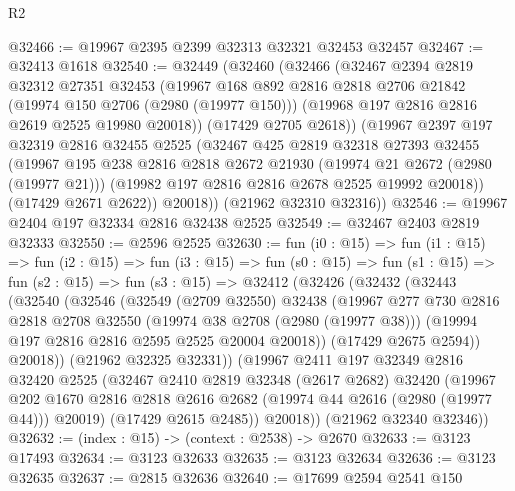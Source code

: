 \begin{lexlean}{R2}
\begin{coremodule}
@32466 := @19967 @2395 @2399 @32313 @32321 @32453 @32457
@32467 := @32413 @1618
@32540 := @32449
    (@32460
      (@32466
        (@32467
          @2394
          @2819
          @32312
          @27351
          @32453
          (@19967
            @168
            @892
            @2816
            @2818
            @2706
            @21842
            (@19974 @150 @2706 (@2980 (@19977 @150)))
            (@19968 @197 @2816 @2816 @2619 @2525 @19980 @20018))
          (@17429 @2705 @2618))
        (@19967
          @2397
          @197
          @32319
          @2816
          @32455
          @2525
          (@32467
            @425
            @2819
            @32318
            @27393
            @32455
            (@19967
              @195
              @238
              @2816
              @2818
              @2672
              @21930
              (@19974 @21 @2672 (@2980 (@19977 @21)))
              (@19982 @197 @2816 @2816 @2678 @2525 @19992 @20018))
            (@17429 @2671 @2622))
          @20018))
      (@21962 @32310 @32316))
@32546 := @19967 @2404 @197 @32334 @2816 @32438 @2525
@32549 := @32467 @2403 @2819 @32333
@32550 := @2596 @2525
@32630 := fun (i0 : @15) =>
  fun (i1 : @15) =>
  fun (i2 : @15) =>
  fun (i3 : @15) =>
  fun (s0 : @15) =>
  fun (s1 : @15) =>
  fun (s2 : @15) =>
  fun (s3 : @15) =>
  @32412
    (@32426
      (@32432
        (@32443
          (@32540
            (@32546
              (@32549
                (@2709 @32550)
                @32438
                (@19967
                  @277
                  @730
                  @2816
                  @2818
                  @2708
                  @32550
                  (@19974 @38 @2708 (@2980 (@19977 @38)))
                  (@19994 @197 @2816 @2816 @2595 @2525 @20004 @20018))
                (@17429 @2675 @2594))
              @20018))
          (@21962 @32325 @32331))
        (@19967
          @2411
          @197
          @32349
          @2816
          @32420
          @2525
          (@32467
            @2410
            @2819
            @32348
            (@2617 @2682)
            @32420
            (@19967
              @202
              @1670
              @2816
              @2818
              @2616
              @2682
              (@19974 @44 @2616 (@2980 (@19977 @44)))
              @20019)
            (@17429 @2615 @2485))
          @20018))
      (@21962 @32340 @32346))
@32632 := (index : @15) -> (context : @2538) -> @2670
@32633 := @3123 @17493
@32634 := @3123 @32633
@32635 := @3123 @32634
@32636 := @3123 @32635
@32637 := @2815 @32636
@32640 := @17699 @2594 @2541 @150

\end{coremodule}
\end{lexlean}
